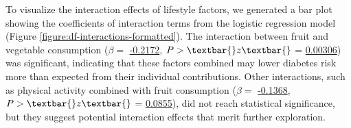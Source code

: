 \documentclass[11pt]{article}
\begin{document}
To visualize the interaction effects of lifestyle factors, we generated a bar plot showing the coefficients of interaction terms from the logistic regression model (Figure \ref{figure:df-interactions-formatted}). The interaction between fruit and vegetable consumption (\(\beta =\) \hyperlink{B3a}{-0.2172}, \(P>\textbar{}z\textbar{}\) = \hyperlink{B3i}{0.00306}) was significant, indicating that these factors combined may lower diabetes risk more than expected from their individual contributions. Other interactions, such as physical activity combined with fruit consumption (\(\beta =\) \hyperlink{B0a}{-0.1368}, \(P>\textbar{}z\textbar{}\) = \hyperlink{B0i}{0.0855}), did not reach statistical significance, but they suggest potential interaction effects that merit further exploration.

\end{document}
